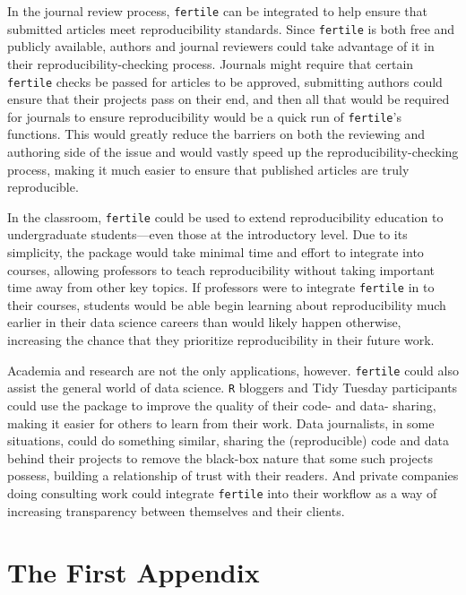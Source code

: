 \documentclass[12pt,twoside]{reedthesis}
\begin{document}
In the journal review process, \texttt{fertile} can be integrated to
help ensure that submitted articles meet reproducibility standards.
Since \texttt{fertile} is both free and publicly available, authors and
journal reviewers could take advantage of it in their
reproducibility-checking process. Journals might require that certain
\texttt{fertile} checks be passed for articles to be approved,
submitting authors could ensure that their projects pass on their end,
and then all that would be required for journals to ensure
reproducibility would be a quick run of \texttt{fertile}'s functions.
This would greatly reduce the barriers on both the reviewing and
authoring side of the issue and would vastly speed up the
reproducibility-checking process, making it much easier to ensure that
published articles are truly reproducible.

In the classroom, \texttt{fertile} could be used to extend
reproducibility education to undergraduate students---even those at the
introductory level. Due to its simplicity, the package would take
minimal time and effort to integrate into courses, allowing professors
to teach reproducibility without taking important time away from other
key topics. If professors were to integrate \texttt{fertile} in to their
courses, students would be able begin learning about reproducibility
much earlier in their data science careers than would likely happen
otherwise, increasing the chance that they prioritize reproducibility in
their future work.

Academia and research are not the only applications, however.
\texttt{fertile} could also assist the general world of data science.
\texttt{R} bloggers and Tidy Tuesday participants could use the package
to improve the quality of their code- and data- sharing, making it
easier for others to learn from their work. Data journalists, in some
situations, could do something similar, sharing the (reproducible) code
and data behind their projects to remove the black-box nature that some
such projects possess, building a relationship of trust with their
readers. And private companies doing consulting work could integrate
\texttt{fertile} into their workflow as a way of increasing transparency
between themselves and their clients.

\appendix

\chapter{The First Appendix}\label{the-first-appendix}
\end{document}
